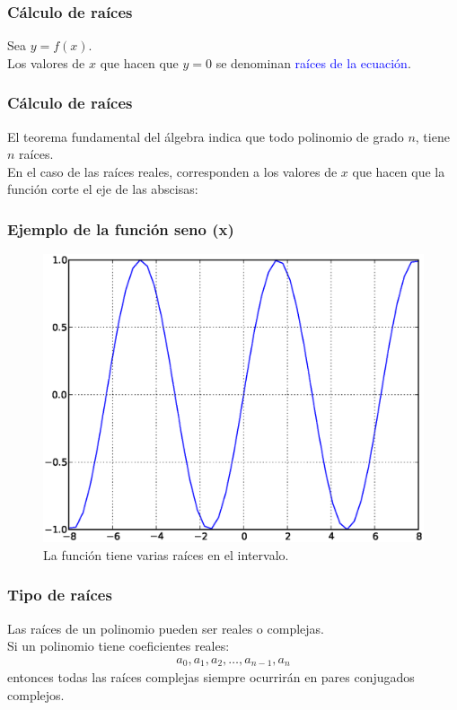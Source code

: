 \documentclass[12pt]{beamer}
\begin{document}
\begin{frame}
\frametitle{Cálculo de raíces}
Sea $y = f (x)$.  
\\
\bigskip
Los valores de $x$ que hacen que $y = 0$ se denominan \textcolor{blue}{raíces de la ecuación}.
\end{frame}
\begin{frame}
\frametitle{Cálculo de raíces}
El teorema fundamental del álgebra indica que todo polinomio de grado $n$, tiene $n$ raíces.
\\
\bigskip
\pause
En el caso de las raíces reales, corresponden a los valores de $x$ que hacen que la función corte el eje de las abscisas:
\end{frame}
\begin{frame}
\frametitle{Ejemplo de la función seno (x)}
\begin{figure}
	\centering
	\includegraphics[scale=0.4]{Imagenes/raices00.eps}
	\caption{La función tiene varias raíces en el intervalo.} 
\end{figure}
\end{frame}
\begin{frame}
\frametitle{Tipo de raíces}
Las raíces de un polinomio pueden ser reales o complejas.
\\
\bigskip
\pause
Si un polinomio tiene coeficientes reales:
\begin{align*}
a_{0}, a_{1}, a_{2}, \ldots, a_{n-1}, a_{n}
\end{align*}
entonces todas las raíces complejas siempre ocurrirán en pares conjugados complejos.
\end{frame}
\end{document}
